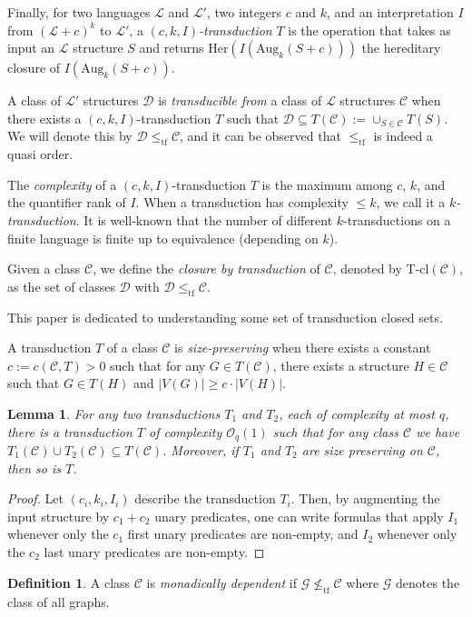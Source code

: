 \documentclass[11pt]{article}
\newtheorem{lemma}[theorem]{Lemma}
\theoremstyle{definition}
\newtheorem{definition}{Definition}
\newcommand{\CC}{{\mathscr C}}
\newcommand{\DD}{{\mathscr D}}
\newcommand{\Oh}{\mathcal{O}}
\renewcommand{\le}{\leqslant}
\renewcommand{\ge}{\geqslant}
\newcommand{\Ll}{\mathcal L}
\newcommand{\remph}[1]{{\color{red} \emph{#1}}}
\newcommand{\Aug}{\text{Aug}}
\newcommand{\tf}{\leqslant_{\text{tf}}}
\newcommand{\Tcl}{\text{T-cl}}
\begin{document}
Finally, for two languages $\Ll$ and $\Ll'$, two integers $c$ and $k$, and an interpretation $I$ from $(\Ll + c)^k$ to $\Ll'$, a \remph{$(c, k, I)$-transduction} $T$ is the operation that takes as input an $\Ll$ structure $S$ and returns $\text{Her}(I(\Aug_k(S + c)))$ the hereditary closure of $I(\Aug_k(S + c))$.

A class of $\Ll'$ structures $\DD$ is \remph{transducible from} a class of $\Ll$ structures $\CC$ when there exists a $(c, k, I)$-transduction $T$ such that $\DD \subseteq  T(\CC) := \cup_{S \in \CC} T(S)$.
We will denote this by $\DD \tf \CC$, and it can be observed that $\tf$ is indeed a quasi order.

The \remph{complexity} of a $(c, k, I)$-transduction $T$ is the maximum among $c$, $k$, and the quantifier rank of $I$.
When a transduction has complexity $\le k$, we call it a \remph{$k$-transduction}.
It is well-known that the number of different $k$-transductions on a finite language is finite up to equivalence (depending on $k$).


Given a class $\CC$, we define the \remph{closure by transduction} of $\CC$, denoted by $\Tcl(\CC)$, as the set of classes $\DD$ with $\DD \tf \CC$.

This paper is dedicated to understanding some set of transduction closed sets.

A transduction $T$ of a class $\CC$ is \remph{size-preserving} when there exists a constant $c := c(\CC, T) > 0$ such that for any $G \in T(\CC)$, there exists a structure $H \in \CC$ such that $G \in T(H)$ and $|V(G)| \ge c \cdot |V(H)|$.

\begin{lemma}\label{lem:transunion}
For any two transductions $T_1$ and $T_2$, each of complexity at most $q$, there is a transduction $T$ of complexity $\Oh_q(1)$ such that for any class $\CC$ we have $T_1(\CC) \cup T_2(\CC) \subseteq T(\CC)$.
Moreover, if $T_1$ and $T_2$ are size preserving on $\CC$, then so is $T$.
\end{lemma}
\begin{proof}
Let $(c_i, k_i, I_i)$ describe the transduction $T_i$.
Then, by augmenting the input structure by $c_1 + c_2$ unary predicates, one can write formulas that apply $I_1$ whenever only the $c_1$ first unary predicates are non-empty, and $I_2$ whenever only the $c_2$ last unary predicates are non-empty.
\end{proof}

\begin{definition}
A class $\CC$ is \remph{monadically dependent} if $\mathcal G \not \tf \CC$ where $\mathcal G$ denotes the class of all graphs.
\end{definition}
\end{document}
